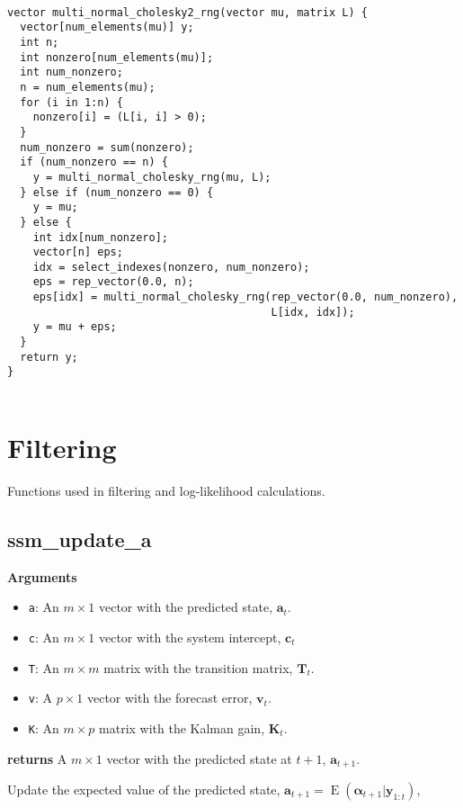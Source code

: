 \documentclass[]{book}
\providecommand{\tightlist}{%
  \setlength{\itemsep}{0pt}\setlength{\parskip}{0pt}}
\DeclareMathOperator{\E}{E}
\newcommand{\mat}[1]{\boldsymbol{#1}}
\renewcommand{\vec}[1]{\boldsymbol{#1}}
\begin{document}
\begin{verbatim}

vector multi_normal_cholesky2_rng(vector mu, matrix L) {
  vector[num_elements(mu)] y;
  int n;
  int nonzero[num_elements(mu)];
  int num_nonzero;
  n = num_elements(mu);
  for (i in 1:n) {
    nonzero[i] = (L[i, i] > 0);
  }
  num_nonzero = sum(nonzero);
  if (num_nonzero == n) {
    y = multi_normal_cholesky_rng(mu, L);
  } else if (num_nonzero == 0) {
    y = mu;
  } else {
    int idx[num_nonzero];
    vector[n] eps;
    idx = select_indexes(nonzero, num_nonzero);
    eps = rep_vector(0.0, n);
    eps[idx] = multi_normal_cholesky_rng(rep_vector(0.0, num_nonzero),
                                         L[idx, idx]);
    y = mu + eps;
  }
  return y;
}


\end{verbatim}

\section{Filtering}\label{filtering-2}

Functions used in filtering and log-likelihood calculations.

\subsection{ssm\_update\_a}\label{ssm_update_a}

\textbf{Arguments}

\begin{itemize}
\tightlist
\item
  \texttt{a}: An \(m \times 1\) vector with the predicted state,
  \(\vec{a}_t\).
\item
  \texttt{c}: An \(m \times 1\) vector with the system intercept,
  \(\vec{c}_t\)
\item
  \texttt{T}: An \(m \times m\) matrix with the transition matrix,
  \(\mat{T}_t\).
\item
  \texttt{v}: A \(p \times 1\) vector with the forecast error,
  \(\vec{v}_t\).
\item
  \texttt{K}: An \(m \times p\) matrix with the Kalman gain,
  \(\mat{K}_t\).
\end{itemize}

\textbf{returns} A \(m \times 1\) vector with the predicted state at
\(t + 1\), \(\vec{a}_{t + 1}\).

Update the expected value of the predicted state,
\(\vec{a}_{t + 1} = \E(\vec{\alpha}_{t + 1} | \vec{y}_{1:t})\),
\end{document}
